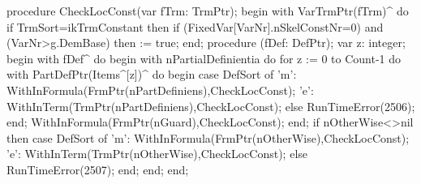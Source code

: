 \nwenddocs{}\endmoddef\nwstartdeflinemarkup{}\nwenddeflinemarkup
procedure CheckLocConst(var fTrm: TrmPtr);
begin
   with VarTrmPtr(fTrm)^ do
      if TrmSort=ikTrmConstant then
         if (FixedVar[VarNr].nSkelConstNr=0) and (VarNr>g.DemBase) then
             := true;
end;
\eatline
{}\nwendcode{}\nwdocspar
\nwenddocs{}\endmoddef\nwstartdeflinemarkup{}\nwenddeflinemarkup
procedure (fDef: DefPtr);
var
   z: integer;
begin
   with fDef^ do
   begin
      with nPartialDefinientia do
         for z := 0 to Count-1 do
            with PartDefPtr(Items^[z])^ do
         begin
            case DefSort of
               'm': WithInFormula(FrmPtr(nPartDefiniens),CheckLocConst);
               'e': WithInTerm(TrmPtr(nPartDefiniens),CheckLocConst);
               else RunTimeError(2506);
            end;
            WithInFormula(FrmPtr(nGuard),CheckLocConst);
         end;
      if nOtherWise<>nil then
         case DefSort of
            'm': WithInFormula(FrmPtr(nOtherWise),CheckLocConst);
            'e': WithInTerm(TrmPtr(nOtherWise),CheckLocConst);
            else RunTimeError(2507);
         end;
   end;
end;
\eatline
